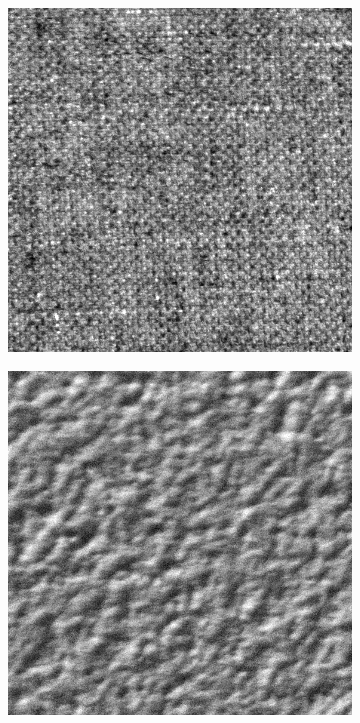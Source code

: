 \begin{figure}[h!]
\begin{subfigure}{.15\textwidth}
\end{subfigure}
\begin{subfigure}{.15\textwidth}
  \centering
  \includegraphics[width=.8\linewidth]{kylberg_examples/canvas1_001.png}
\end{subfigure}
\begin{subfigure}{.15\textwidth}
  \centering
  \includegraphics[width=.8\linewidth]{kylberg_examples/ceiling1_001.png}
\end{subfigure}%

\end{figure}
